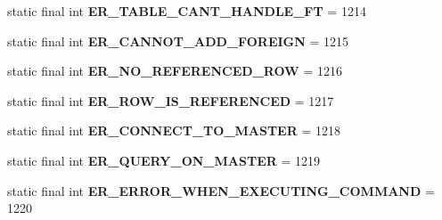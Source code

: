 \begin{DoxyCompactItemize}
\item 
\mbox{\label{classcom_1_1mysql_1_1jdbc_1_1_mysql_error_numbers_a4d933fdd2f6c64f5594455393d980467}} 
static final int {\bfseries E\+R\+\_\+\+T\+A\+B\+L\+E\+\_\+\+C\+A\+N\+T\+\_\+\+H\+A\+N\+D\+L\+E\+\_\+\+FT} = 1214
\item 
\mbox{\label{classcom_1_1mysql_1_1jdbc_1_1_mysql_error_numbers_a5b0f2546ddabddcc0c4c066098353392}} 
static final int {\bfseries E\+R\+\_\+\+C\+A\+N\+N\+O\+T\+\_\+\+A\+D\+D\+\_\+\+F\+O\+R\+E\+I\+GN} = 1215
\item 
\mbox{\label{classcom_1_1mysql_1_1jdbc_1_1_mysql_error_numbers_a7436eaad6fd5132b738289bfc99d691d}} 
static final int {\bfseries E\+R\+\_\+\+N\+O\+\_\+\+R\+E\+F\+E\+R\+E\+N\+C\+E\+D\+\_\+\+R\+OW} = 1216
\item 
\mbox{\label{classcom_1_1mysql_1_1jdbc_1_1_mysql_error_numbers_ab74427c2807f7bf84eeee33b4b13cb79}} 
static final int {\bfseries E\+R\+\_\+\+R\+O\+W\+\_\+\+I\+S\+\_\+\+R\+E\+F\+E\+R\+E\+N\+C\+ED} = 1217
\item 
\mbox{\label{classcom_1_1mysql_1_1jdbc_1_1_mysql_error_numbers_a92bfb23c7d03c696e0f8c108c8365d5a}} 
static final int {\bfseries E\+R\+\_\+\+C\+O\+N\+N\+E\+C\+T\+\_\+\+T\+O\+\_\+\+M\+A\+S\+T\+ER} = 1218
\item 
\mbox{\label{classcom_1_1mysql_1_1jdbc_1_1_mysql_error_numbers_a8627b7dff83e13b101b8bb1d96425b65}} 
static final int {\bfseries E\+R\+\_\+\+Q\+U\+E\+R\+Y\+\_\+\+O\+N\+\_\+\+M\+A\+S\+T\+ER} = 1219
\item 
\mbox{\label{classcom_1_1mysql_1_1jdbc_1_1_mysql_error_numbers_a9c916502ca5cdc5c943430b6728c34d1}} 
static final int {\bfseries E\+R\+\_\+\+E\+R\+R\+O\+R\+\_\+\+W\+H\+E\+N\+\_\+\+E\+X\+E\+C\+U\+T\+I\+N\+G\+\_\+\+C\+O\+M\+M\+A\+ND} = 1220
\item 
\mbox{\label{classcom_1_1mysql_1_1jdbc_1_1_mysql_error_numbers_a18b102849de00ff64858d18fe20569f7}} 

\end{DoxyCompactItemize}
